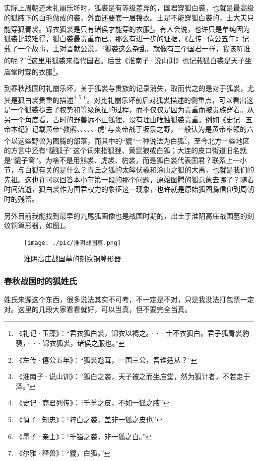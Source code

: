 \documentclass[UTF8, 12pt, A4paper]{article}
\begin{document}
实际上周朝还未礼崩乐坏时，狐裘是有等级差异的，国君穿狐白裘，也就是最高级的狐腋下的白毛做成的裘，外面还要套一层锦衣。士是不能穿狐白裘的，士大夫只能穿狐青裘。锦衣狐裘是只有诸侯才能穿的衣服\footnote{《礼记·玉藻》：“君衣狐白裘，锦衣以裼之。···士不衣狐白。君子狐青裘豹褎，···锦衣狐裘，诸侯之服也。”}。有人会说，也许只是单纯因为狐裘比较难得，狐白裘最贵重而已。那么有进一步的证据，《左传·僖公五年》记载了一个故事，士对晋献公说，“狐裘这么杂乱，就像有三个国君一样，我该听谁的呢？”\footnote{《左传·僖公五年》：“狐裘尨茸，一国三公，吾谁适从？”}这里用狐裘来指代国君。后世《淮南子·说山训》也记载狐白裘是天子坐庙堂时穿的衣服\footnote{《淮南子·说山训》：“狐白之裘，天子被之而坐庙堂，然为狐计者，不若走于泽。”}。

到春秋战国时礼崩乐坏，关于狐裘与贵族的记录消失，取而代之的是对于狐裘，尤其是狐白裘贵重的描述\footnote{《史记·商君列传》：“千羊之皮，不如一狐之腋”} \footnote{《慎子·知忠》：“粹白之裘，盖非一狐之皮也”} \footnote{《墨子·亲士》：“千镒之裘，非一狐之白。”}。对比礼崩乐坏前后对狐裘描述的侧重点，可以看出这是一个狐裘褪去了权势和等级象征的过程，而不仅仅是因为贵重而被贵族穿着。从另一个角度看，古时的野兽远不止狐狸，没有理由唯独狐裘贵重。例如《史记·五帝本纪》记载黄帝“教熊、、、、、虎”与炎帝战于坂泉之野，一般认为是黄帝率领的六个以这些野兽为图腾的部落，而其中的“貔”一种说法为白狐\footnote{《尔雅·释兽》：“貔，白狐。”}，至今北方一些地区的方言中还有“貔狐子”这个词来指狐狸、黄鼠狼或白狐；大连的皮口街道旧名就是“貔子窝”。为啥不是用熊裘、虎裘、豹裘，而是狐白裘代表国君？联系上一小节，与白狐有关的是什么？青丘之狐的太皞伏羲和涂山之狐的大禹，也就是我们的先祖。这也许可以回答本小节第一段的那个问题，原始图腾的狐意象去哪了？随着时间流逝，狐白裘作为国君权力的象征这一现象，也许就是原始狐图腾信仰到周朝时的残留。

另外目前我能找到最早的九尾狐画像也是战国时期的，出土于淮阴高庄战国墓的刻纹铜箄形器，如图\ref{fig:huaiyin}。

\begin{figure}[ht]
    \centering
    \texttt{[image: ./pic/淮阴战国墓.png]}
    \caption{淮阴高庄战国墓的刻纹铜箄形器}
    \label{fig:huaiyin}
\end{figure}

\subsubsection{春秋战国时的狐姓氏}

姓氏来源这个东西，很多说法其实不可考，不一定是不对，只是我没法打包票一定对。这里的几段大家看看就好，可以当真，但不要完全当真。
\end{document}
